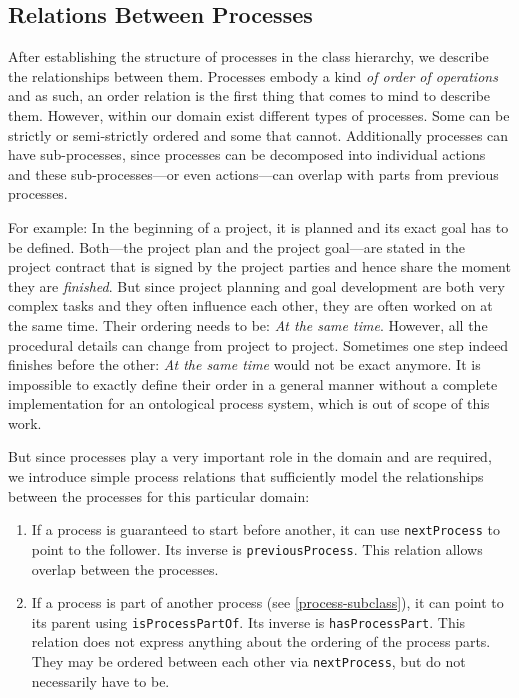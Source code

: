 \documentclass[a4paper, DIV=13, BCOR=0cm]{scrbook}
\newcommand{\relation}[1]{\texttt{#1}}
\begin{document}
\subsection{Relations Between Processes}
After establishing the structure of processes in the class hierarchy, we describe the relationships between them. Processes embody a kind \textit{of order of operations} and as such, an order relation is the first thing that comes to mind to describe them. However, within our domain exist different types of processes. Some can be strictly or semi-strictly ordered and some that cannot. Additionally processes can have sub-processes, since processes can be decomposed into individual actions and these sub-processes---or even actions---can overlap with parts from previous processes.

For example: In the beginning of a project, it is planned and its exact goal has to be defined. Both---the project plan and the project goal---are stated in the project contract that is signed by the project parties and hence share the moment they are \textit{finished}. But since project planning and goal development are both very complex tasks and they often influence each other, they are often worked on at the same time. Their ordering needs to be: \textit{At the same time}. However, all the procedural details can change from project to project. Sometimes one step indeed finishes before the other: \textit{At the same time} would not be exact anymore. It is impossible to exactly define their order in a general manner without a complete implementation for an ontological process system, which is out of scope of this work.

But since processes play a very important role in the domain and are required, we introduce simple process relations that sufficiently model the relationships between the processes for this particular domain:
\begin{enumerate}
	\item If a process is guaranteed to start before another, it can use \relation{nextProcess} to point to the follower. Its inverse is \relation{previousProcess}. This relation allows overlap between the processes.
	\item If a process is part of another process (see \autoref{process-subclass}), it can point to its parent using \relation{isProcessPartOf}. Its inverse is \relation{hasProcessPart}. This relation does not express anything about the ordering of the process parts. They may be ordered between each other via \relation{nextProcess}, but do not necessarily have to be.
\end{enumerate}
\end{document}
